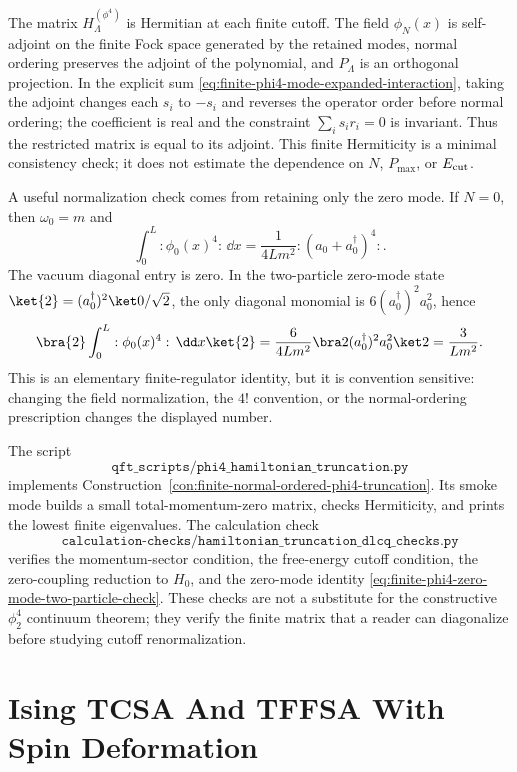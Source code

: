 The matrix \(H_\Lambda^{(\phi^4)}\) is Hermitian at each finite cutoff.  The
field \(\phi_N(x)\) is self-adjoint on the finite Fock space generated by the
retained modes, normal ordering preserves the adjoint of the polynomial, and
\(P_\Lambda\) is an orthogonal projection.  In the explicit sum
\eqref{eq:finite-phi4-mode-expanded-interaction}, taking the adjoint changes
each \(s_i\) to \(-s_i\) and reverses the operator order before normal
ordering; the coefficient is real and the constraint
\(\sum_i s_i r_i=0\) is invariant.  Thus the restricted matrix is equal to
its adjoint.  This finite Hermiticity is a minimal consistency check; it does
not estimate the dependence on \(N\), \(P_{\max}\), or \(E_{\rm cut}\).

A useful normalization check comes from retaining only the zero mode.  If
\(N=0\), then \(\omega_0=m\) and
\[
  \int_0^L:\phi_0(x)^4:\,\dd x
  =
  \frac{1}{4Lm^2}:(a_0+a_0^\dagger)^4: .
\]
The vacuum diagonal entry is zero.  In the two-particle zero-mode state
\(\ket{2}=(a_0^\dagger)^2\ket0/\sqrt2\), the only diagonal monomial is
\(6(a_0^\dagger)^2a_0^2\), hence
\begin{equation}
  \bra{2}\int_0^L:\phi_0(x)^4:\,\dd x\ket{2}
  =
  \frac{6}{4Lm^2}\bra2(a_0^\dagger)^2a_0^2\ket2
  =
  \frac{3}{Lm^2}.
  \label{eq:finite-phi4-zero-mode-two-particle-check}
\end{equation}
This is an elementary finite-regulator identity, but it is convention
sensitive: changing the field normalization, the \(4!\) convention, or the
normal-ordering prescription changes the displayed number.

The script
\[
  \texttt{qft\_scripts/phi4\_hamiltonian\_truncation.py}
\]
implements Construction~\ref{con:finite-normal-ordered-phi4-truncation}.
Its smoke mode builds a small total-momentum-zero matrix, checks Hermiticity,
and prints the lowest finite eigenvalues.  The calculation check
\[
  \texttt{calculation-checks/hamiltonian\_truncation\_dlcq\_checks.py}
\]
verifies the momentum-sector condition, the free-energy cutoff condition, the
zero-coupling reduction to \(H_0\), and the zero-mode identity
\eqref{eq:finite-phi4-zero-mode-two-particle-check}.  These checks are not a
substitute for the constructive \(\phi^4_2\) continuum theorem; they verify
the finite matrix that a reader can diagonalize before studying cutoff
renormalization.

\section{Ising TCSA And TFFSA With Spin Deformation}

